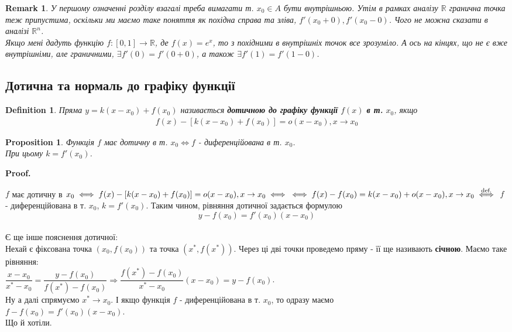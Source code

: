 \documentclass[a4paper, 14pt]{article}
\makeatletter
\def\qed{$\blacksquare$}
\theoremstyle{theoremdd}
\theoremstyle{theoremdd}
\newtheorem{definition}[theorem]{Definition}
\theoremstyle{theoremdd}
\theoremstyle{theoremdd}
\theoremstyle{theoremdd}
\newtheorem{proposition}[theorem]{Proposition}
\theoremstyle{theoremdd}
\newtheorem{remark}[theorem]{Remark}
\theoremstyle{theoremdd}
\theoremstyle{theoremdd}
\renewenvironment{proof}[1][Proof.\\]{\par
\pushQED{\hfill \qed}%
\normalfont \topsep6\p@\@plus6\p@\relax
\trivlist
\item\relax
{\bfseries
#1\@addpunct{.}}\hspace\labelsep\ignorespaces
}{%
\popQED\endtrivlist\@endpefalse
}
\makeatother
\begin{document}
\begin{remark}
У першому означенні розділу взагалі треба вимагати т. $x_0 \in A$ бути внутрішньою. Утім в рамках аналізу $\mathbb{R}$ гранична точка теж припустима, оскільки ми маємо таке поняття як похідна справа та зліва, $f'(x_0+0),f'(x_0-0)$. Чого не можна сказати в аналізі $\mathbb{R}^n$.\\
Якщо мені дадуть функцію $f: [0,1] \to \mathbb{R}$, де $f(x) = e^x$, то з похідними в внутрішніх точок все зрозуміло. А ось на кінцях, що не є вже внутрішніми, але граничними, $\exists f'(0) = f'(0+0)$, а також $\exists f'(1) = f'(1-0)$.
\end{remark}

\subsection{Дотична та нормаль до графіку функції}
\begin{definition}
Пряма $y = k (x-x_0) + f(x_0)$ називається \textbf{дотичною до графіку функції} $f(x)$ \textbf{в т.} $x_0$, якщо
\begin{align*}
f(x) - [k(x-x_0)+f(x_0)] = o(x-x_0), x\to x_0
\end{align*}
\end{definition}

\begin{proposition}
Функція $f$ має дотичну в т. $x_0 \iff f$ - диференційована в т. $x_0$. \\ При цьому $k = f'(x_0)$.
\end{proposition}

\begin{proof}
$f$ має дотичну в $x_0 \iff f(x) - [k(x-x_0)+f(x_0)] = o(x-x_0), x \to x_0 \iff \\ \iff f(x)-f(x_0) = k(x-x_0) + o(x-x_0), x \to x_0 \overset{\textrm{def.}}{\iff}$ $f$ - диференційована в т. $x_0$, $k=f'(x_0)$.
\end{proof}
Таким чином, рівняння дотичної задається формулою $$y - f(x_0) = f'(x_0)(x-x_0)$$
\bigskip \\
Є ще інше пояснення дотичної:\\
Нехай є фіксована точка $(x_0,f(x_0))$ та точка $(x^*,f(x^*))$. Через ці дві точки проведемо пряму - її ще називають \textbf{січною}. Маємо таке рівняння:\\
$\dfrac{x-x_0}{x^*-x_0} = \dfrac{y-f(x_0)}{f(x^*) - f(x_0)} \Rightarrow \dfrac{f(x^*)-f(x_0)}{x^*-x_0}(x-x_0) = y - f(x_0)$.\\
Ну а далі спрямуємо $x^* \to x_0$. І якщо функція $f$ - диференційована в т. $x_0$, то одразу маємо\\
$f - f(x_0) = f'(x_0)(x-x_0)$.\\
Що й хотіли.
\end{document}
